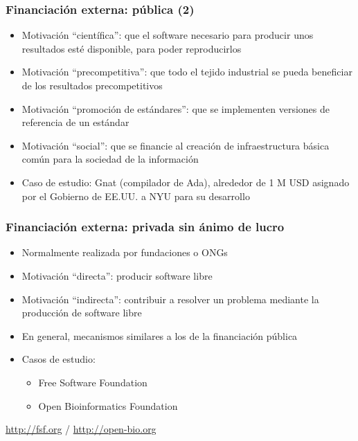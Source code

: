 
\begin{frame}
\frametitle{Financiación externa: pública (2)}

\begin{itemize}
\item Motivación ``científica'': que el software necesario para
  producir unos resultados esté disponible, para poder reproducirlos
\item Motivación ``precompetitiva'': que todo el tejido industrial se
  pueda beneficiar de los resultados precompetitivos
\item Motivación ``promoción de estándares'': que se implementen
  versiones de referencia de un estándar
\item Motivación ``social'': que se financie al creación de
  infraestructura básica común para la sociedad de la información
\item Caso de estudio: Gnat (compilador de Ada), alrededor de 1 M USD
  asignado por el Gobierno de EE.UU. a NYU para
    su desarrollo
\end{itemize}

\end{frame}


\begin{frame}
\frametitle{Financiación externa: privada sin ánimo de lucro}

\begin{itemize}
\item Normalmente realizada por fundaciones o ONGs
\item Motivación ``directa'': producir software libre
\item Motivación ``indirecta'': contribuir a resolver un problema
  mediante la producción de software libre
\item En general, mecanismos similares a los de la financiación
  pública
\item Casos de estudio: 
  \begin{itemize}
  \item Free Software Foundation
  \item Open Bioinformatics Foundation
  \end{itemize}
\end{itemize}

\begin{flushright}
\url{http://fsf.org} / \url{http://open-bio.org}
\end{flushright}
\end{frame}

